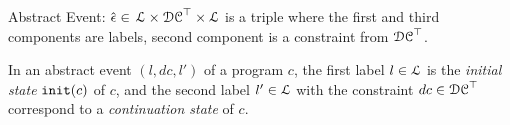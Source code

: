 \begin{defn}
 \label{def:abs_event}
 Abstract Event: 
 $\hat{\mathtt{\epsilon}{}} \in $
 $\mathcal{L} \times \mathcal{DC}^{\top} \times \mathcal{L}$
 is a 
 triple where the first and third components are labels,
 second component is a constraint from $\mathcal{DC}^{\top}$.
 \end{defn}
 In an abstract event $(l, dc, l')$ of a program $c$, 
 the first label $l \in \mathcal{L}$ is the \emph{initial state} $\mathtt{init}(c)$ of $c$, and 
 the second label $l' \in \mathcal{L}$ with the constraint $dc \in \mathcal{DC}^{\top}$ correspond to a \emph{continuation state} of $c$.

